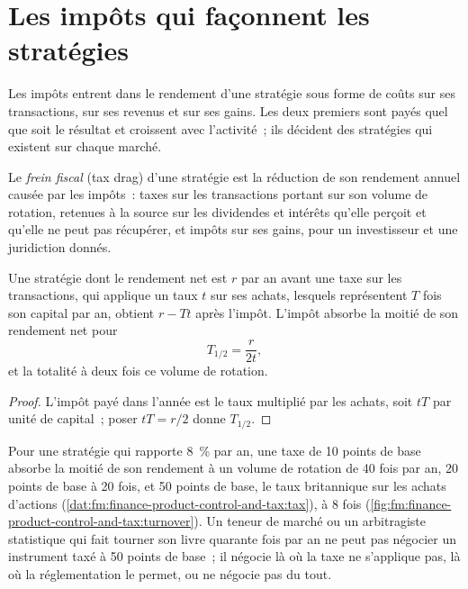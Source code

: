 \section{Les impôts qui façonnent les stratégies}

Les impôts entrent dans le rendement d'une stratégie sous forme de coûts sur ses transactions, sur ses revenus et sur ses gains. Les deux premiers sont payés quel que soit le résultat et croissent avec
l'activité~; ils décident des stratégies qui existent sur chaque marché.

\begin{definition}\label{def:fm:finance-product-control-and-tax:drag}
Le \emph{frein fiscal} (tax drag) d'une stratégie est la réduction de son rendement annuel causée par les impôts~: taxes sur les transactions portant sur son volume de rotation,
retenues à la source sur les dividendes et intérêts qu'elle perçoit et qu'elle ne peut pas récupérer, et impôts sur ses gains, pour un investisseur et une juridiction donnés.
\end{definition}

\begin{proposition}\label{prop:fm:finance-product-control-and-tax:half}
Une stratégie dont le rendement net est $r$ par an avant une taxe sur les transactions, qui applique un taux $t$ sur ses achats, lesquels représentent $T$ fois son capital par an, obtient
$r-Tt$ après l'impôt. L'impôt absorbe la moitié de son rendement net pour
\[
T_{1/2}=\frac{r}{2t},
\]
et la totalité à deux fois ce volume de rotation.
\end{proposition}

\begin{proof}
L'impôt payé dans l'année est le taux multiplié par les achats, soit $tT$ par unité de capital~; poser $tT=r/2$ donne $T_{1/2}$.
\end{proof}

Pour une stratégie qui rapporte 8~\% par an, une taxe de 10 points de base absorbe la moitié de son rendement à un volume de rotation de 40 fois par an, 20 points de base à 20 fois, et
50 points de base, le taux britannique sur les achats d'actions (\cref{dat:fm:finance-product-control-and-tax:tax}), à 8 fois
(\cref{fig:fm:finance-product-control-and-tax:turnover}). Un teneur de marché ou un arbitragiste statistique qui fait tourner son livre quarante fois par an ne peut pas
négocier un instrument taxé à 50 points de base~; il négocie là où la taxe ne s'applique pas, là où la réglementation le permet, ou ne négocie pas du tout.

